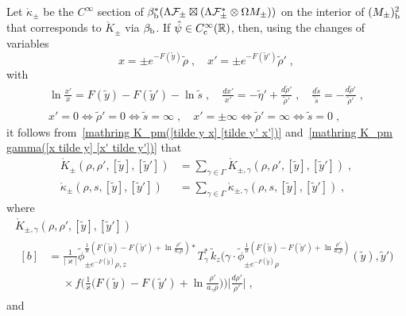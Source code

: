 \documentclass{memo-l}
\theoremstyle{plain}
\theoremstyle{definition}
\theoremstyle{remark}
\newcommand{\R}{\mathbb{R}}
\newcommand{\FF}{\mathcal{F}}
\newcommand{\Cinftyc}{C^\infty_{\text{\rm c}}}
\numberwithin{section}{chapter}
\numberwithin{equation}{section}%
\begin{document}
Let $\mathring\kappa_\pm$ \index{$\mathring\kappa_\pm$} be the $C^\infty$ section of $\beta_{\text{\rm b}}^*(\Lambda\FF_\pm \boxtimes (\Lambda\FF^*_\pm\otimes \Omega M_\pm))$ on the interior of $(M_\pm)^2_{\text{\rm b}}$ that corresponds to $\mathring K_\pm$ via $\beta_{\text{\rm b}}$. If $\hat\psi\in\Cinftyc(\R)$, then, using the changes of variables
\[
x=\pm e^{-F(\tilde y)}\tilde\rho\;,\quad x'=\pm e^{-F(\tilde y')}\tilde\rho'\;,
\] 
with
\begin{gather*}
\ln\frac{x'}{x}=F(\tilde y)-F(\tilde y')-\ln\tilde s\;,\quad
\frac{dx'}{x'}=-\tilde\eta'+\frac{d\tilde\rho'}{\tilde\rho'}\;,\quad
\frac{d\tilde s}{\tilde s}=-\frac{d\tilde\rho'}{\tilde\rho'}\;,\\
x'=0\Leftrightarrow\tilde\rho'=0\Leftrightarrow\tilde s=\infty\;,\quad 
x'=\pm\infty\Leftrightarrow\tilde\rho'=\infty\Leftrightarrow\tilde s=0\;,
\end{gather*}
it follows from~\eqref{mathring K_pm([tilde y x] [tilde y' x'])} and~\eqref{mathring K_pm gamma([x tilde y] [x' tilde y'])} that
\begin{align}
\mathring K_\pm(\rho,\rho',[\tilde y],[\tilde y'])&=\sum_{\gamma\in\Gamma}\mathring K_{\pm,\gamma}(\rho,\rho',[\tilde y],[\tilde y'])\;,
\label{mathring K_pm(rho rho' [tilde y] [tilde y'])}\\
\mathring\kappa_\pm(\rho,s,[\tilde y],[\tilde y'])
&=\sum_{\gamma\in\Gamma}\mathring\kappa_{\pm,\gamma}(\rho,s,[\tilde y],[\tilde y'])\;,
\label{mathring kappa_pm(rho s [tilde y] [tilde y'])}
\end{align}
where 
\begin{multline}\label{mathring K_pm gamma(rho rho' [tilde y] [tilde y'])}
\mathring K_{\pm,\gamma}(\rho,\rho',[\tilde y],[\tilde y'])\\
\begin{aligned}[b]
&=\frac{1}{|\varkappa|}
\tilde\phi_{\pm e^{-F(\tilde y)}\rho,z}^{\frac{1}{\varkappa}(F(\tilde y)-F(\tilde y')
+\ln \frac{\rho'}{a_\gamma\rho})*}T_\gamma^*\,\tilde k_z\Big(\gamma\cdot 
\tilde\phi^{\frac{1}{\varkappa}(F(\tilde y)-F(\tilde y')+\ln \frac{\rho'}{a_\gamma\rho})}_{\pm e^{-F(\tilde y)}\rho}(\tilde y),\tilde y'\Big)\\
&\phantom{=\text{}}\text{}\times f\Big(\frac{1}{\varkappa}\Big(F(\tilde y)-F(\tilde y')
+\ln\frac{\rho'}{a_\gamma\rho}\Big)\Big)\Big|\frac{d\rho'}{\rho'}\Big|\;,
\end{aligned}
\end{multline}
and \index{$\mathring\kappa_{\pm,\gamma}$}
\end{document}
